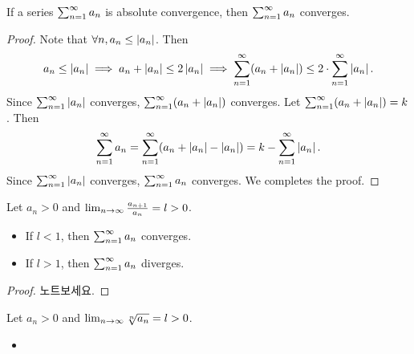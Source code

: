 \begin{theorem}
  If a series $\sum_{n=1}^{\infty} a_n$ is absolute convergence, then $\sum_{n=1}^{\infty} a_n$ converges.
  \label{thm:ser_test_abs}
\end{theorem}
\begin{proof}
  Note that $\forall n, a_n \le \left| a_n \right|$. Then
  \begin{equation}
    a_n \le \left| a_n \right| \implies a_n + \left| a_n \right| \le 2\left| a_n \right| \implies
    \sum_{n=1}^{\infty} (a_n + \left| a_n \right|) \le 2 \cdot \sum_{n=1}^{\infty} \left| a_n \right|.
  \end{equation}
  Since $\sum_{n=1}^{\infty} \left| a_n \right|$ converges, $\sum_{n=1}^{\infty} (a_n + \left| a_n \right|)$ converges.
  Let $\sum_{n=1}^{\infty} (a_n + \left| a_n \right|) = k$. Then
  \begin{equation}
    \sum_{n=1}^{\infty} a_n = \sum_{n=1}^{\infty} (a_n + \left| a_n \right| - \left| a_n \right|) = k - \sum_{n=1}^{\infty} \left| a_n \right|.
  \end{equation}
  Since $\sum_{n=1}^{\infty} \left| a_n \right|$ converges, $\sum_{n=1}^{\infty} a_n$ converges. We completes
  the proof.
\end{proof}

\begin{theorem}
  Let $a_n > 0$ and $\lim_{n \to \infty} \frac{a_{n+1}}{a_n} = l > 0$.
  \begin{itemize}
    \item If $l < 1$, then $\sum_{n=1}^{\infty} a_n$ converges.
    \item If $l > 1$, then $\sum_{n=1}^{\infty} a_n$ diverges.
  \end{itemize}
  \label{thm:ser_test_ratio}
\end{theorem}
\begin{proof}
  노트보세요.
\end{proof}

\begin{theorem}
  Let $a_n > 0$ and $\lim_{n \to \infty} \sqrt[n]{a_n} = l > 0$.
  \begin{itemize}
    \item
  \end{itemize}
  \label{thm:ser_test_root}
\end{theorem}

